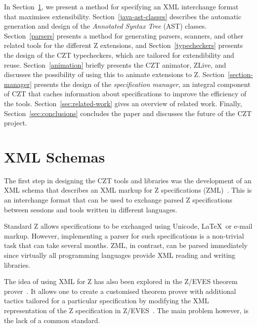 \documentclass{llncs}
\begin{document}
  In Section~\ref{xml-schemas}, we present a method for specifying an
  XML interchange format that maximises extensibility.
  Section~\ref{java-ast-classes} describes the automatic generation
  and design of the \emph{Annotated Syntax Tree} (AST) classes.
  Section~\ref{parsers} presents a method for generating parsers,
  scanners, and other related tools for the different Z extensions,
  and Section~\ref{typecheckers} presents the design of the CZT
  typecheckers, which are tailored for extendibility and
  reuse. Section~\ref{animation} briefly presents the CZT animator,
  ZLive, and discusses the possibility of using this to animate
  extensions to Z. Section~\ref{section-manager} presents the design
  of the {\em specification manager}, an integral component of CZT
  that caches information about specifications to improve the
  efficiency of the tools.  Section~\ref{sec:related-work} gives an
  overview of related work.  Finally, Section~\ref{sec:conclusions}
  concludes the paper and discusses the future of the CZT project.


\section{XML Schemas}
\label{xml-schemas}

  The first step in designing the CZT tools and libraries was the
  development of an XML schema that describes an XML markup for Z
  specifications (ZML)~\cite{UttEA:03}.  This is an interchange format
  that can be used to exchange parsed Z specifications between
  sessions and tools written in different languages.

  Standard Z allows specifications to be exchanged using Unicode,
  \LaTeX\ or e-mail markup.  However, implementing a parser for such
  specifications is a non-trivial task that can take several months.
  ZML, in contrast, can be parsed immediately since virtually all
  programming languages provide XML reading and writing libraries.

  The idea of using XML for Z has also been explored in the
  Z/EVES theorem prover~\cite{tp.tools:zeves.ref}.  It allows one to
  create a customised theorem prover with additional tactics tailored
  for a particular specification by modifying the XML representation
  of the Z specification in Z/EVES~\cite{tp.tools:zeves.api}.
  The main problem however, is the lack of a common standard.
\end{document}

